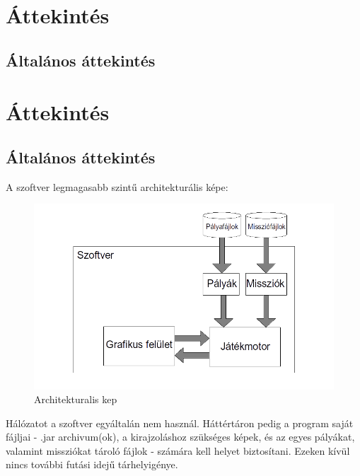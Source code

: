 \section{Áttekintés}
\subsection{Általános áttekintés}

\section{Áttekintés}
\subsection{Általános áttekintés}

\begin{samepage}
A szoftver legmagasabb szintű architekturális képe:
\newline
\begin{figure}
\centering
\includegraphics[width=170mm]{images/architekturalis_kep.png}
\caption{Architekturalis kep}
\label{overflow}
\end{figure}
\end{samepage}
\newline
Hálózatot a szoftver egyáltalán nem használ. Háttértáron pedig a program saját fájljai - .jar archivum(ok), a kirajzoláshoz szükséges képek, és az egyes pályákat, valamint missziókat tároló fájlok - számára kell helyet biztosítani. Ezeken kívül nincs további futási idejű tárhelyigénye.

